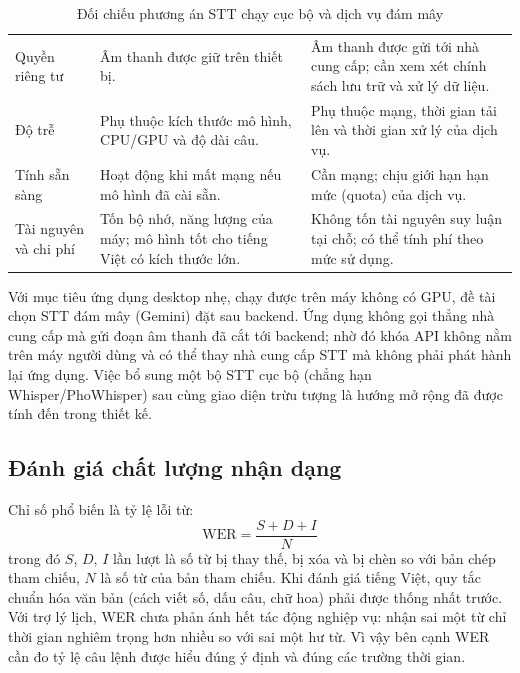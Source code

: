 \begin{table}[!htbp]
\caption{Đối chiếu phương án STT chạy cục bộ và dịch vụ đám mây}\label{tab:stt}
\bang
\begin{tabularx}{\textwidth}{|L{2.8cm}|Y|Y|}\hline
{} &  & \\\hline
Quyền riêng tư & Âm thanh được giữ trên thiết bị. & Âm thanh được gửi tới nhà cung cấp; cần xem xét chính sách lưu trữ và xử lý dữ liệu.\\\hline
Độ trễ & Phụ thuộc kích thước mô hình, CPU/GPU và độ dài câu. & Phụ thuộc mạng, thời gian tải lên và thời gian xử lý của dịch vụ.\\\hline
Tính sẵn sàng & Hoạt động khi mất mạng nếu mô hình đã cài sẵn. & Cần mạng; chịu giới hạn hạn mức (quota) của dịch vụ.\\\hline
Tài nguyên và chi phí & Tốn bộ nhớ, năng lượng của máy; mô hình tốt cho tiếng Việt có kích thước lớn. & Không tốn tài nguyên suy luận tại chỗ; có thể tính phí theo mức sử dụng.\\\hline
\end{tabularx}
\end{table}
Với mục tiêu ứng dụng desktop nhẹ, chạy được trên máy không có GPU, đề tài chọn STT đám mây (Gemini) đặt sau backend. Ứng dụng không gọi thẳng nhà cung cấp mà gửi đoạn âm thanh đã cắt tới backend; nhờ đó khóa API không nằm trên máy người dùng và có thể thay nhà cung cấp STT mà không phải phát hành lại ứng dụng. Việc bổ sung một bộ STT cục bộ (chẳng hạn Whisper/PhoWhisper) sau cùng giao diện trừu tượng là hướng mở rộng đã được tính đến trong thiết kế.

\subsection{Đánh giá chất lượng nhận dạng}
Chỉ số phổ biến là tỷ lệ lỗi từ:
\begin{equation}
  \mathrm{WER} = \frac{S + D + I}{N}
\end{equation}
trong đó $S$, $D$, $I$ lần lượt là số từ bị thay thế, bị xóa và bị chèn so với bản chép tham chiếu, $N$ là số từ của bản tham chiếu. Khi đánh giá tiếng Việt, quy tắc chuẩn hóa văn bản (cách viết số, dấu câu, chữ hoa) phải được thống nhất trước. Với trợ lý lịch, WER chưa phản ánh hết tác động nghiệp vụ: nhận sai một từ chỉ thời gian nghiêm trọng hơn nhiều so với sai một hư từ. Vì vậy bên cạnh WER cần đo tỷ lệ câu lệnh được hiểu đúng ý định và đúng các trường thời gian.

